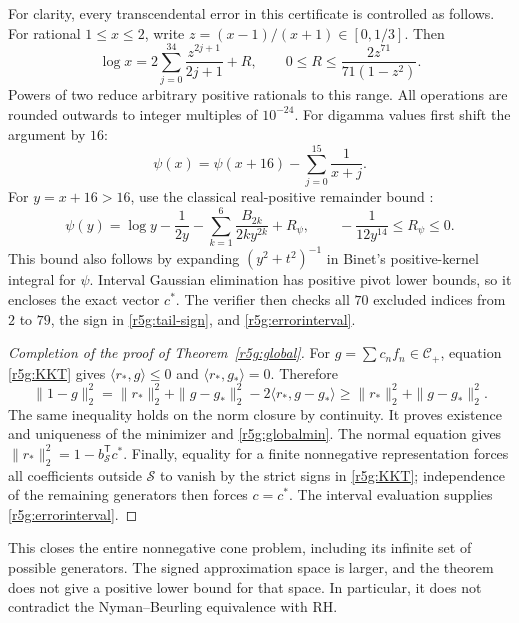 \documentclass[11pt,a4paper]{article}
\theoremstyle{definition}\newtheorem{definition}[theorem]{Definition}
\theoremstyle{remark}\newtheorem{remark}[theorem]{Remark}
\numberwithin{equation}{section}
\begin{document}
For clarity, every transcendental error in this certificate is
controlled as follows. For rational $1\le x\le2$, write
$z=(x-1)/(x+1)\in[0,1/3]$. Then
\[
 \log x=2\sum_{j=0}^{34}\frac{z^{2j+1}}{2j+1}+R,
 \qquad 0\le R\le\frac{2z^{71}}{71(1-z^2)}.
\]
Powers of two reduce arbitrary positive rationals to this range.
All operations are rounded outwards to integer multiples of
$10^{-24}$. For digamma values first shift the argument by $16$:
\[
 \psi(x)=\psi(x+16)-\sum_{j=0}^{15}\frac1{x+j}.
\]
For $y=x+16>16$, use the classical real-positive remainder bound
\cite[\S5.11(ii)]{DLMF}:
\begin{equation}\label{r5g:psi-certificate}
 \psi(y)=\log y-\frac1{2y}
           -\sum_{k=1}^{6}\frac{B_{2k}}{2ky^{2k}}+R_\psi,
 \qquad -\frac1{12y^{14}}\le R_\psi\le0.
\end{equation}
This bound also follows by expanding
$(y^2+t^2)^{-1}$ in Binet's positive-kernel integral for $\psi$.
Interval Gaussian elimination has positive pivot lower bounds,
so it encloses the exact vector $c^*$.
The verifier then checks all $70$ excluded indices from $2$ to $79$,
the sign in \eqref{r5g:tail-sign}, and \eqref{r5g:errorinterval}.

\begin{proof}[Completion of the proof of Theorem~\ref{r5g:global}]
For $g=\sum c_nf_n\in\mathcal C_+$, equation \eqref{r5g:KKT}
gives $\langle r_*,g\rangle\le0$ and
$\langle r_*,g_*\rangle=0$. Therefore
\[
 \|1-g\|_2^2
 =\|r_*\|_2^2+\|g-g_*\|_2^2-2\langle r_*,g-g_*\rangle
 \ge\|r_*\|_2^2+\|g-g_*\|_2^2.
\]
The same inequality holds on the norm closure by continuity.
It proves existence and uniqueness of the minimizer and
\eqref{r5g:globalmin}. The normal equation gives
$\|r_*\|_2^2=1-b_{\mathcal S}^{\mathsf T}c^*$.
Finally, equality for a finite nonnegative representation forces
all coefficients outside $\mathcal S$ to vanish by the strict signs
in \eqref{r5g:KKT}; independence of the remaining generators then
forces $c=c^*$. The interval evaluation supplies
\eqref{r5g:errorinterval}.
\end{proof}

This closes the entire nonnegative cone problem, including its
infinite set of possible generators. The signed approximation
space is larger, and the theorem does not give a positive lower
bound for that space. In particular, it does not contradict the
Nyman--Beurling equivalence with RH.

\end{document}
